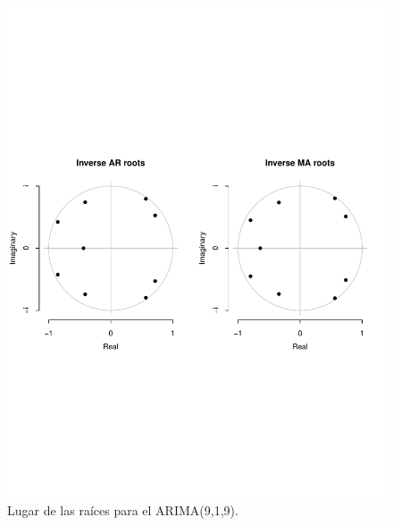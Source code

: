 \documentclass[conference]{IEEEtran}
\begin{document}
\begin{figure}
    \centering
    \includegraphics[width=\columnwidth]{figs/AR9stationary.pdf}
    \caption{Lugar de las raíces para el ARIMA(9,1,9).}
    \label{fig:Inverti1}
\end{figure}
\end{document}
